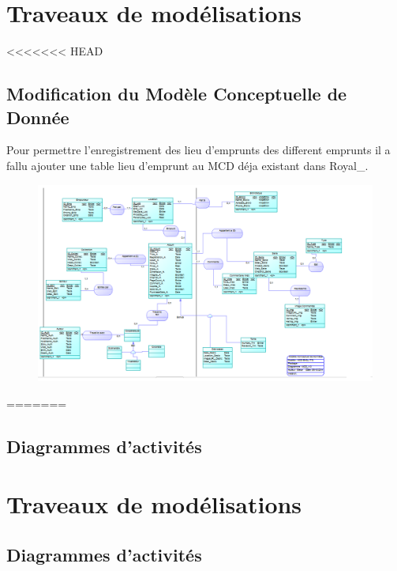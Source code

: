 \section{Traveaux de modélisations} 
<<<<<<< HEAD
\subsection{Modification du Modèle Conceptuelle de Donnée}

Pour permettre l'enregistrement des lieu d'emprunts des different emprunts il a fallu ajouter une table lieu d'emprunt au MCD déja existant dans Royal\_.
\begin{figure}
\includegraphics[width=12cm]{MCD_Royal_Modif.png}
\end{figure}
=======

\subsection{Diagrammes d'activités}

\section{Traveaux de modélisations}

\subsection{Diagrammes d'activités}

